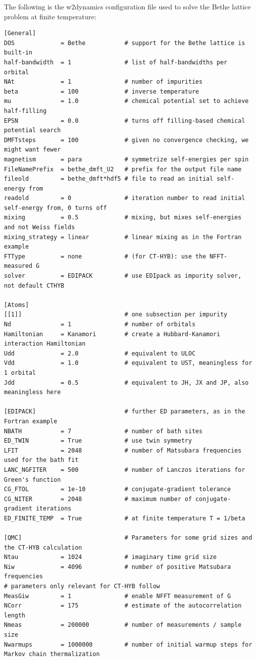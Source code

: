 \documentclass[edipack_sp.tex]{subfiles}
\begin{document}
The following is the w2dynamics configuration file used to solve the Bethe lattice problem at finite temperature: 
\begin{lstlisting}[style=mybash,language={},numbers=none,basicstyle={\scriptsize\ttfamily}]
[General]
DOS             = Bethe           # support for the Bethe lattice is built-in
half-bandwidth  = 1               # list of half-bandwidths per orbital
NAt             = 1               # number of impurities
beta            = 100             # inverse temperature
mu              = 1.0             # chemical potential set to achieve half-filling
EPSN            = 0.0             # turns off filling-based chemical potential search
DMFTsteps       = 100             # given no convergence checking, we might want fewer
magnetism       = para            # symmetrize self-energies per spin
FileNamePrefix  = bethe_dmft_U2   # prefix for the output file name
fileold         = bethe_dmft*hdf5 # file to read an initial self-energy from
readold         = 0               # iteration number to read initial self-energy from, 0 turns off
mixing          = 0.5             # mixing, but mixes self-energies and not Weiss fields
mixing_strategy = linear          # linear mixing as in the Fortran example
FTType          = none            # (for CT-HYB): use the NFFT-measured G
solver          = EDIPACK         # use EDIpack as impurity solver, not default CTHYB

[Atoms]
[[1]]                             # one subsection per impurity
Nd              = 1               # number of orbitals
Hamiltonian     = Kanamori        # create a Hubbard-Kanamori interaction Hamiltonian
Udd             = 2.0             # equivalent to ULOC
Vdd             = 1.0             # equivalent to UST, meaningless for 1 orbital
Jdd             = 0.5             # equivalent to JH, JX and JP, also meaningless here

[EDIPACK]                         # further ED parameters, as in the Fortran example
NBATH           = 7               # number of bath sites
ED_TWIN         = True            # use twin symmetry
LFIT            = 2048            # number of Matsubara frequencies used for the bath fit
LANC_NGFITER    = 500             # number of Lanczos iterations for Green's function
CG_FTOL         = 1e-10           # conjugate-gradient tolerance
CG_NITER        = 2048            # maximum number of conjugate-gradient iterations
ED_FINITE_TEMP  = True            # at finite temperature T = 1/beta

[QMC]                             # Parameters for some grid sizes and the CT-HYB calculation
Ntau            = 1024            # imaginary time grid size
Niw             = 4096            # number of positive Matsubara frequencies
# parameters only relevant for CT-HYB follow
MeasGiw         = 1               # enable NFFT measurement of G
NCorr           = 175             # estimate of the autocorrelation length
Nmeas           = 200000          # number of measurements / sample size
Nwarmups        = 1000000         # number of initial warmup steps for Markov chain thermalization
\end{lstlisting}
\end{document}
